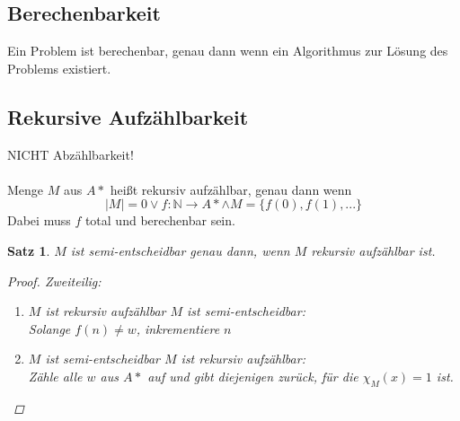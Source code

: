 \documentclass{article}
\begin{document}
\subsection{Berechenbarkeit}
Ein Problem ist berechenbar, genau dann wenn ein Algorithmus zur Lösung des Problems existiert.
\subsection{Rekursive Aufzählbarkeit}
\Rightarrow NICHT Abzählbarkeit!\\\\
Menge $M$ aus $A*$ heißt rekursiv aufzählbar, genau dann wenn
\begin{equation}
    |M|=0 \vee f:\mathbb{N}\rightarrow A* \wedge M=\{f(0), f(1),...\}
\end{equation}
Dabei muss $f$ total und berechenbar sein.\\
\newtheorem*{RaSe}{Satz}
\begin{framed}
    \begin{RaSe}
        $M$ ist semi-entscheidbar genau dann, wenn $M$ rekursiv aufzählbar ist.
        \begin{proof}
            Zweiteilig:
            \begin{enumerate}
                \item $M$ ist rekursiv aufzählbar \Rightarrow $M$ ist semi-entscheidbar:\\
                      Solange $f(n) \not= w$, inkrementiere $n$
                \item $M$ ist semi-entscheidbar \Rightarrow $M$ ist rekursiv aufzählbar:\\
                      Zähle alle $w$ aus $A*$ auf und gibt diejenigen zurück, für die $\chi_M(x) = 1$ ist.
            \end{enumerate}
            \qedhere
        \end{proof}
    \end{RaSe}
\end{framed}
\end{document}
